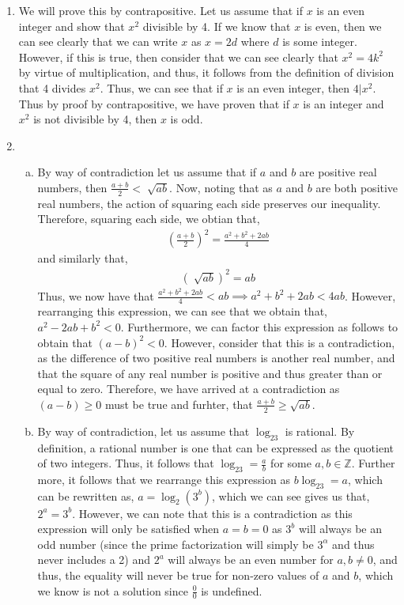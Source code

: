 \documentclass[11pt]{article}
\begin{document}
\begin{enumerate}
	\item We will prove this by contrapositive. Let us assume that if $x$ is an even integer and show that $x^2$ divisible by 4. If we know that $x$ is even, then we can see clearly that we can write $x$ as $x = 2d$ where $d$ is some integer. However, if this is true, then consider that we can see clearly that $x^2 = 4k^2$ by virtue of multiplication, and thus, it follows from the definition of division that 4 divides $x^2$. Thus, we can see that if $x$ is an even integer, then $4|x^2$. Thus by proof by contrapositive, we have proven that if $x$ is an integer and $x^2$ is not divisible by 4, then $x$ is odd.
 	\item \begin{enumerate}[(a)]
		 \item By way of contradiction let us assume that if $a$ and $b$ are positive real numbers, then $\frac{a+b}{2} < \sqrt[]{ab}$. Now, noting that as $a$ and $b$ are both positive real numbers, the action of squaring each side preserves our inequality. Therefore, squaring each side, we obtian that,
  		\begin{align*}
			  (\frac{a+b}{2})^2 = \frac{a^2+b^2+2ab}{4}
		  \end{align*}
		  and similarly that,
		  \begin{align*}
			  (\sqrt[]{ab})^2 = ab 
		  \end{align*}
		  Thus, we now have that $ \frac{a^2+b^2+2ab}{4} < ab \implies a^2+b^2+2ab < 4ab$. However, rearranging this expression, we can see that we obtain that, $a^2-2ab+b^2 <0$.
		  Furthermore, we can factor this expression as follows to obtain that $(a-b)^2 < 0$. However, consider that this is a contradiction, as the difference of two positive real numbers is another real number, and that the square of any real number is positive and thus greater than or equal to zero.
		  Therefore, we have arrived at a contradiction as $(a-b)\geq 0$ must be true and furhter, that $\frac{a+b}{2} \geq \sqrt{ab}$.
		 \item By way of contradiction, let us assume that $\log_23$ is rational. By definition, a rational number is one that can be expressed as the quotient of two integers. Thus, it follows that $\log_23 = \frac{a}{b}$ for some  $a,b \in \mathbb{Z}$. Further more, it follows that we rearrange this expression as $b\log_23 = a$, which can be rewritten as,
		$a = \log_2(3^b)$, which we can see gives us that, $2^a = 3^b$. However, we can note that this is a contradiction as this expression will only be satisfied when $a = b = 0$ as $3^b$ will always be an odd number (since the prime factorization will simply be $3^{\alpha}$ and thus never includes a 2) and $2^a$ will always be an even number for $a,b \neq 0$, and thus, the equality will never be true for non-zero values of $a$ and $b$, which we know is not a solution since $\frac{0}{0}$ is undefined.

\end{enumerate}
\end{enumerate}
\end{document}
